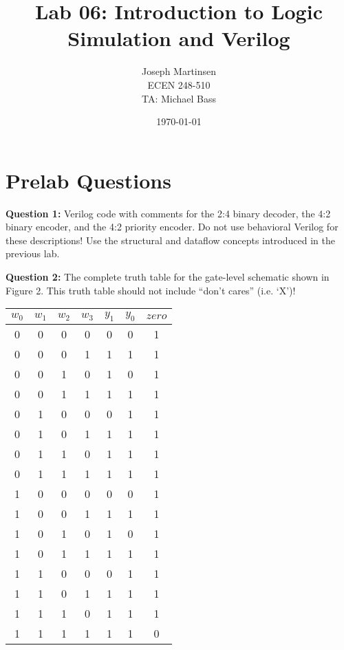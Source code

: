 \documentclass[a4paper,12pt]{article}
\title{\textbf{Lab 06: Introduction to Logic Simulation and Verilog}}
\author{Joseph Martinsen \\ ECEN 248-510 \\ TA: Michael Bass}
\date{\today}
\begin{document}
\section*{Prelab Questions}

\textbf{Question 1:} Verilog code with comments for the 2:4 binary decoder, the 4:2 binary encoder, and the 4:2 priority
encoder. Do not use behavioral Verilog for these descriptions! Use the structural and dataflow
concepts introduced in the previous lab.







\vspace{10pt}
\hspace{-15pt}\textbf{Question 2:} The complete truth table for the gate-level schematic shown in Figure 2. This truth table should not
include “don’t cares” (i.e. ‘X’)!
\begin{center}
      \begin{tabular}{c c c c||c c c}
        \hline
        $w_0$ & $w_1$ & $w_2$ & $w_3$ & $y_1$ & $y_0$ & $zero$ \\ [0.5ex]
        \hline
        0 & 0 & 0 & 0 & 0 & 0 & 1 \\
        0 & 0 & 0 & 1 & 1 & 1 & 1 \\
        0 & 0 & 1 & 0 & 1 & 0 & 1 \\
        0 & 0 & 1 & 1 & 1 & 1 & 1 \\
        \hline
        0 & 1 & 0 & 0 & 0 & 1 & 1 \\
        0 & 1 & 0 & 1 & 1 & 1 & 1 \\
        0 & 1 & 1 & 0 & 1 & 1 & 1 \\
        0 & 1 & 1 & 1 & 1 & 1 & 1 \\
        \hline
        1 & 0 & 0 & 0 & 0 & 0 & 1 \\
        1 & 0 & 0 & 1 & 1 & 1 & 1 \\
        1 & 0 & 1 & 0 & 1 & 0 & 1 \\
        1 & 0 & 1 & 1 & 1 & 1 & 1 \\
        \hline
        1 & 1 & 0 & 0 & 0 & 1 & 1 \\
        1 & 1 & 0 & 1 & 1 & 1 & 1 \\
        1 & 1 & 1 & 0 & 1 & 1 & 1 \\
        1 & 1 & 1 & 1 & 1 & 1 & 0
      \end{tabular}
  \end{center}
\end{document}

